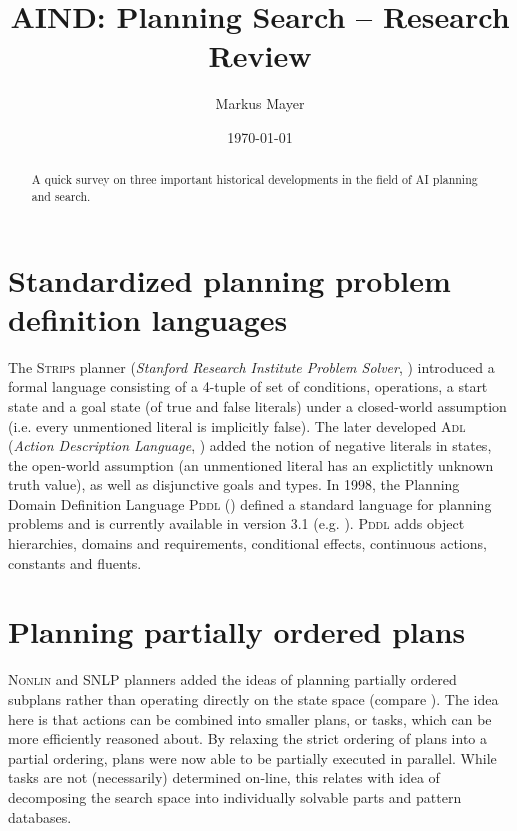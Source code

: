 \documentclass[12pt, a4paper, oneside]{article}
\title{AIND: Planning Search -- Research Review}
\author{Markus Mayer}
\date{\today}
\begin{document}
\maketitle

\begin{abstract}
A quick survey on three important historical developments in the field of AI planning and search.
\end{abstract}

\section{Standardized planning problem definition languages}

The \textsc{Strips} planner (\textit{Stanford Research Institute Problem Solver}, \cite{Fikes:1971:SNA:1622876.1622939})
introduced a formal language consisting of a 4-tuple of set of conditions, operations, 
a start state and a goal state (of true and false literals) under a closed-world
assumption (i.e. every unmentioned literal is implicitly false).
The later developed \textsc{Adl} (\textit{Action Description Language}, \cite{Pednault:1989:AEM:112922.112954}) added the
notion of negative literals in states, the open-world assumption (an unmentioned literal
has an explictitly unknown truth value), as well as disjunctive goals and types.
In 1998, the Planning Domain Definition Language \textsc{Pddl} (\cite{Ghallab98}) defined a standard
language for planning problems and is currently available in version 3.1 (e.g. \cite{Interplan14}).
\textsc{Pddl} adds object hierarchies, domains and requirements, conditional effects, continuous actions, constants and fluents.

\section{Planning partially ordered plans}

\textsc{Nonlin} and \textsc{SNLP} planners added the ideas of planning partially ordered
subplans rather than operating directly on the state space (compare \cite{russell2009artificial}).
The idea here is that actions can be combined into smaller plans, or tasks,
which can be more efficiently reasoned about.
By relaxing the strict ordering of plans into a partial ordering,
plans were now able to be partially executed in parallel.
While tasks are not (necessarily) determined on-line, this relates 
with idea of decomposing the search space into individually solvable parts 
and pattern databases.
\end{document}
